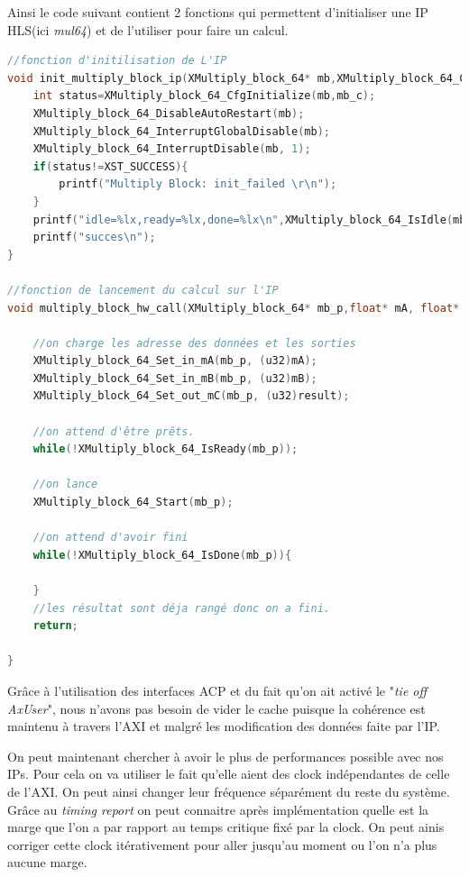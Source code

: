 \documentclass[12pt,a4paper]{ieee}
\begin{document}
Ainsi le code suivant contient 2 fonctions qui permettent d'initialiser une IP HLS(ici \textit{mul64}) et de l'utiliser pour faire un calcul.
\begin{lstlisting}[language=C]
//fonction d'initilisation de L'IP
void init_multiply_block_ip(XMultiply_block_64* mb,XMultiply_block_64_Config* mb_c){
	int status=XMultiply_block_64_CfgInitialize(mb,mb_c);
	XMultiply_block_64_DisableAutoRestart(mb);
	XMultiply_block_64_InterruptGlobalDisable(mb);
	XMultiply_block_64_InterruptDisable(mb, 1);
	if(status!=XST_SUCCESS){
		printf("Multiply Block: init_failed \r\n");
	}
	printf("idle=%lx,ready=%lx,done=%lx\n",XMultiply_block_64_IsIdle(mb),XMultiply_block_64_IsReady(mb),XMultiply_block_64_IsDone(mb));
	printf("succes\n");
}

//fonction de lancement du calcul sur l'IP
void multiply_block_hw_call(XMultiply_block_64* mb_p,float* mA, float* mB, float* result){

	//on charge les adresse des données et les sorties
	XMultiply_block_64_Set_in_mA(mb_p, (u32)mA);
	XMultiply_block_64_Set_in_mB(mb_p, (u32)mB);
	XMultiply_block_64_Set_out_mC(mb_p, (u32)result);

	//on attend d'être prêts.
	while(!XMultiply_block_64_IsReady(mb_p));
	
	//on lance
	XMultiply_block_64_Start(mb_p);
	
	//on attend d'avoir fini	
	while(!XMultiply_block_64_IsDone(mb_p)){
		
	}
	//les résultat sont déja rangé donc on a fini.
	return;

}

\end{lstlisting}
Grâce à l'utilisation des interfaces ACP et du fait qu'on ait activé le "\textit{tie off AxUser}", nous n'avons pas besoin de vider le cache puisque la cohérence est maintenu à travers l'AXI et malgré les modification des données faite par l'IP.


On peut maintenant chercher à avoir le plus de performances possible avec nos IPs. Pour cela on va utiliser le fait qu'elle aient des clock indépendantes de celle de l'AXI. On peut ainsi changer leur fréquence séparément du reste du système.\\

Grâce au \textit{timing report} on peut connaitre après implémentation quelle est la marge que l'on a par rapport au temps critique fixé par la clock. On peut ainis corriger cette clock itérativement pour aller jusqu'au moment ou l'on n'a plus aucune marge.
\end{document}
